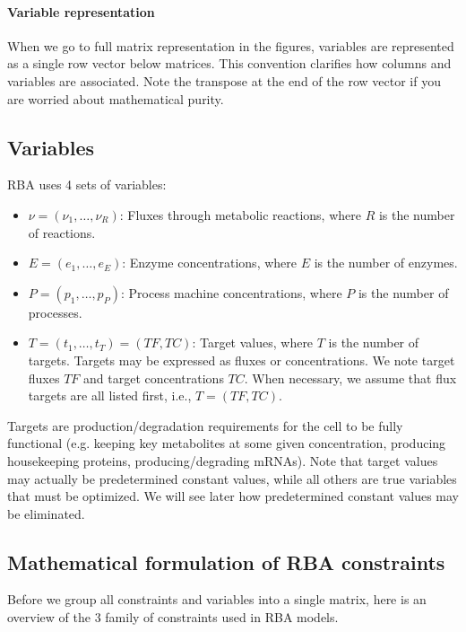 \documentclass[12pt]{scrartcl}
\theoremstyle{definition}
\theoremstyle{remark}
\numberwithin{equation}{section}
\begin{document}
\paragraph{Variable representation}
When we go to full matrix representation in the figures,
variables are represented as a single row vector below matrices.
This convention clarifies how columns and variables are associated.
Note the transpose at the end of the row vector if you are worried about
mathematical purity.

\subsection{Variables}

RBA uses 4 sets of variables:

\begin{itemize}
  \item $\nu = (\nu_1, \ldots ,\nu_R)$: Fluxes through metabolic reactions,
  where $R$ is the number of reactions.
  \item $E = (e_1, \ldots, e_E)$: Enzyme concentrations,
  where $E$ is the number of enzymes.
  \item $P = (p_1, \ldots, p_P)$: Process machine concentrations,
  where $P$ is the number of processes.
  \item $T = (t_1, \ldots, t_T) = (TF, TC)$:
  Target values, where $T$ is the number of targets.
  Targets may be expressed as fluxes or concentrations.
  We note target fluxes $TF$ and target concentrations $TC$.
  When necessary, we assume that flux targets are all listed first,
  i.e., $T = (TF, TC)$.

\end{itemize}
Targets are production/degradation requirements for the cell to be fully functional
(e.g. keeping key metabolites at some given concentration,
producing housekeeping proteins, producing/degrading mRNAs).
Note that target values may actually be predetermined constant values,
while all others are true variables that must be optimized.
We will see later how predetermined constant values may be eliminated.

\subsection{Mathematical formulation of RBA constraints}

Before we group all constraints and variables into a single matrix,
here is an overview of the 3 family of constraints used in RBA models.
\end{document}
